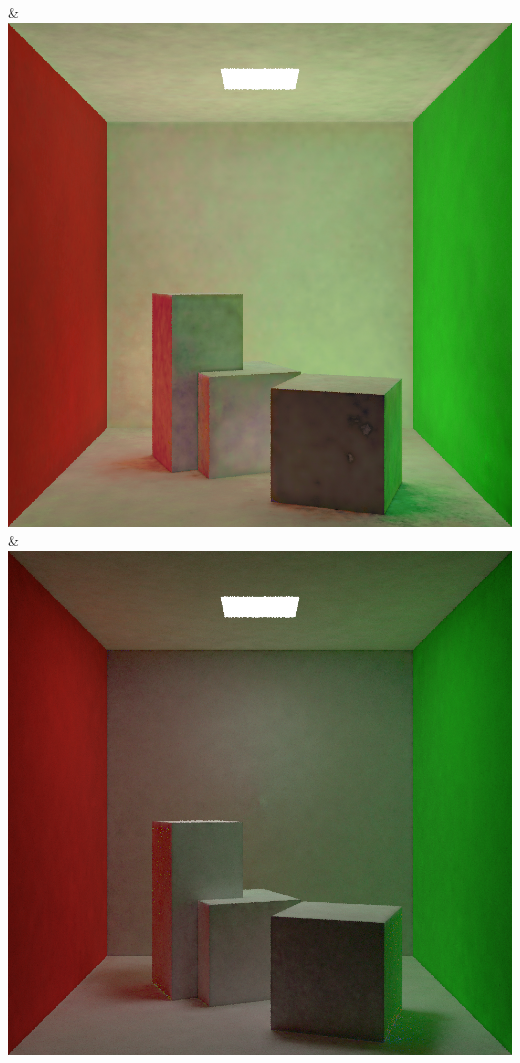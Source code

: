 & \includegraphics[width=\linewidth]{figures/py/tests/quality_comparison/nrc+lt+bal_1spp_diffuse.png}
& \includegraphics[width=\linewidth]{figures/py/tests/quality_comparison/nrc+sppc_1spp_diffuse.png}
